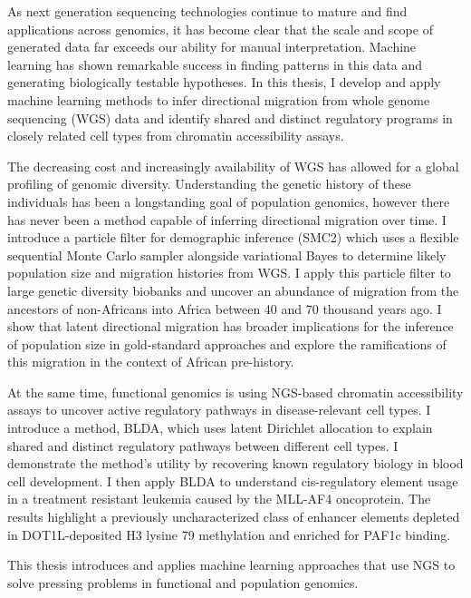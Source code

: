 As next generation sequencing technologies continue to mature and find applications across genomics, it has become clear that the scale and scope of generated data far exceeds our ability for manual interpretation. Machine learning has shown remarkable success in finding patterns in this data and generating biologically testable hypotheses. In this thesis, I develop and apply machine learning methods to infer directional migration from whole genome sequencing (WGS) data and identify shared and distinct regulatory programs in closely related cell types from chromatin accessibility assays. 

The decreasing cost and increasingly availability of WGS has allowed for a global profiling of genomic diversity. Understanding the genetic history of these individuals has been a longstanding goal of population genomics, however there has never been a method capable of inferring directional migration over time. I introduce a particle filter for demographic inference (SMC2) which uses a flexible sequential Monte Carlo sampler alongside variational Bayes to determine likely population size and migration histories from WGS. I apply this particle filter to large genetic diversity biobanks and uncover an abundance of migration from the ancestors of non-Africans into Africa between 40 and 70 thousand years ago. I show that latent directional migration has broader implications for the inference of population size in gold-standard approaches and explore the ramifications of this migration in the context of African pre-history.

At the same time, functional genomics is using NGS-based chromatin accessibility assays to uncover active regulatory pathways in disease-relevant cell types. I introduce a method, BLDA, which uses latent Dirichlet allocation to explain shared and distinct regulatory pathways between different cell types. I demonstrate the method's utility by recovering known regulatory biology in blood cell development. I then apply BLDA to understand cis-regulatory element usage in a treatment resistant leukemia caused by the MLL-AF4 oncoprotein. The results highlight a previously uncharacterized class of enhancer elements depleted in DOT1L-deposited H3 lysine 79 methylation and enriched for PAF1c binding. 

This thesis introduces and applies machine learning approaches that use NGS to solve pressing problems in functional and population genomics. 